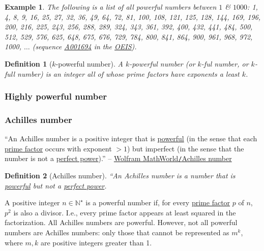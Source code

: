 \documentclass{article}
\newtheorem{definition}{Definition}
\newtheorem{example}{Example}
\begin{document}
\begin{example}
	The following is a list of all powerful numbers between $1$ \& $1000$: \emph{1, 4, 8, 9, 16, 25, 27, 32, 36, 49, 64, 72, 81, 100, 108, 121, 125, 128, 144, 169, 196, 200, 216, 225, 243, 256, 288, 289, 324, 343, 361, 392, 400, 432, 441, 484, 500, 512, 529, 576, 625, 648, 675, 676, 729, 784, 800, 841, 864, 900, 961, 968, 972, 1000}, $\ldots$ (sequence \href{https://oeis.org/A001694}{A001694} in the \href{https://en.wikipedia.org/wiki/On-Line_Encyclopedia_of_Integer_Sequences}{OEIS}).
\end{example}

\begin{definition}[$k$-powerful number]
	A \emph{$k$-powerful number} (or \emph{$k$-ful number}, or \emph{$k$-full number}) is an integer all of whose prime factors have exponents a least $k$.
\end{definition}

\subsubsection{Highly powerful number}

\subsubsection{Achilles number}
``An Achilles number is a positive integer that is \href{https://mathworld.wolfram.com/PowerfulNumber.html}{powerful} (in the sense that each \href{https://mathworld.wolfram.com/PrimeFactor.html}{prime factor} occurs with exponent $> 1$) but imperfect (in the sense that the number is not a \href{https://mathworld.wolfram.com/PerfectPower.html}{perfect power}).'' -- \href{https://mathworld.wolfram.com/AchillesNumber.html}{Wolfram MathWorld\texttt{/}Achilles number}

\begin{definition}[Achilles number]
	``An \emph{Achilles number} is a number that is \href{https://en.wikipedia.org/wiki/Powerful_number}{powerful} but not a \href{https://en.wikipedia.org/wiki/Perfect_power}{perfect power}.
\end{definition}
A positive integer $n\in\mathbb{N}^\star$ is a powerful number if, for every \href{https://en.wikipedia.org/wiki/Prime_factor}{prime factor} $p$ of $n$, $p^2$ is also a divisor. I.e., every prime factor appears at least squared in the factorization. All Achilles numbers are powerful. However, not all powerful numbers are Achilles numbers: only those that cannot be represented as $m^k$, where $m,k$ are positive integers greater than 1.
\end{document}
